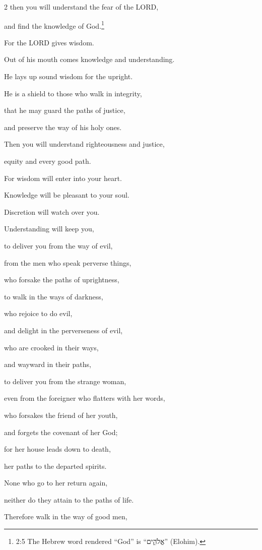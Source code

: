 \begin{multicols}{2}
\myverse{}then you will understand the fear of the LORD,

and find the knowledge of God.\footnote{2:5 The Hebrew word rendered “God” is “אֱלֹהִ֑ים” (Elohim).}


\myverse{}For the LORD gives wisdom.

Out of his mouth comes knowledge and understanding.


\myverse{}He lays up sound wisdom for the upright.

He is a shield to those who walk in integrity,


\myverse{}that he may guard the paths of justice,

and preserve the way of his holy ones.


\myverse{}Then you will understand righteousness and justice,

equity and every good path.


\myverse{}For wisdom will enter into your heart.

Knowledge will be pleasant to your soul.


\myverse{}Discretion will watch over you.

Understanding will keep you,


\myverse{}to deliver you from the way of evil,

from the men who speak perverse things,


\myverse{}who forsake the paths of uprightness,

to walk in the ways of darkness,


\myverse{}who rejoice to do evil,

and delight in the perverseness of evil,


\myverse{}who are crooked in their ways,

and wayward in their paths,


\myverse{}to deliver you from the strange woman,

even from the foreigner who flatters with her words,


\myverse{}who forsakes the friend of her youth,

and forgets the covenant of her God;


\myverse{}for her house leads down to death,

her paths to the departed spirits.


\myverse{}None who go to her return again,

neither do they attain to the paths of life.


\myverse{}Therefore walk in the way of good men,


\end{multicols}
